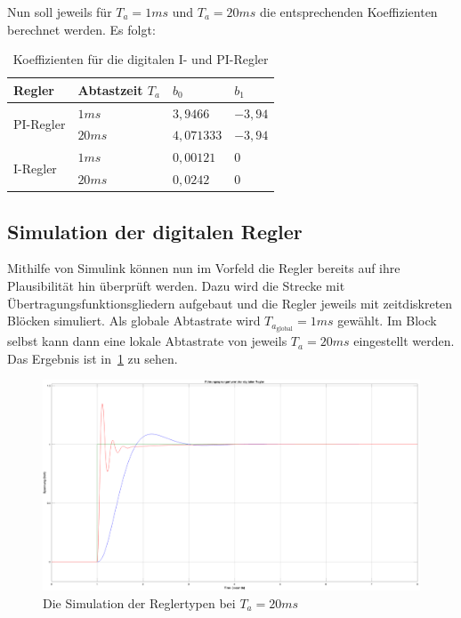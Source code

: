 \documentclass{report}
\begin{document}
Nun soll jeweils für $T_{a} = 1ms$ und $T_{a} = 20ms$ die entsprechenden Koeffizienten berechnet werden. Es folgt:

\begin{table}[!ht]
	\centering
	\begin{tabular}{|l|l|l|l|}
		\hline
		Regler                     & Abtastzeit $T_{a}$ & $b_{0}$    & $b_{1}$ \\
		\hline
		\multirow{2}{*}{PI-Regler} & $1ms$              & $3,9466$   & $-3,94$ \\
		\cline{2-4}
		                           & $20ms$             & $4,071333$ & $-3,94$ \\
		\hline
		\multirow{2}{*}{I-Regler}  & $1ms$              & $0,00121$  & $0$     \\
		\cline{2-4}
		                           & $20ms$             & $0,0242$   & $0$     \\
		\hline
	\end{tabular}
	\caption{Koeffizienten für die digitalen I- und PI-Regler}
	\label{tab:koeIPI}
\end{table}


\subsection{Simulation der digitalen Regler}
\label{sec:simul-der-digit}

Mithilfe von Simulink können nun im Vorfeld die Regler bereits auf ihre Plausibilität hin überprüft werden. Dazu wird die Strecke mit Übertragungsfunktionsgliedern aufgebaut und die Regler jeweils mit zeitdiskreten Blöcken simuliert. Als globale Abtastrate wird $T_{a_{\mathrm{global}}} = 1ms$ gewählt. Im Block selbst kann dann eine lokale Abtastrate von jeweils $T_{a} = 20ms$ eingestellt werden. Das Ergebnis ist in~\ref{fig:sim-i-pi} zu sehen.

\begin{figure}[!ht]
	\centering
	\includegraphics[width=\textwidth]{./assets/img/sim_i_pi.png}
	\caption{Die Simulation der Reglertypen bei $T_a = 20ms$ }
	\label{fig:sim-i-pi}
\end{figure}
\end{document}
